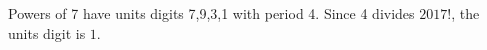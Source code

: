 Powers of 7 have units digits 7,9,3,1 with period 4. Since 4 divides $2017!$, the units digit is $\boxed1$.
